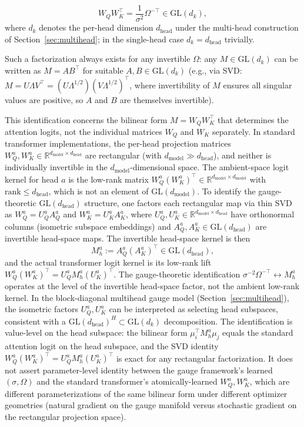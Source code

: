 \documentclass[twoside,11pt]{article}
\begin{document}
\begin{equation}
W_Q W_K^\top = \frac{1}{\sigma^2} \Omega^{-\top} \in \mathrm{GL}(d_k),
\end{equation}
where $d_k$ denotes the per-head dimension $d_{\text{head}}$ under the multi-head construction of Section~\ref{sec:multihead}; in the single-head case $d_k = d_{\text{head}}$ trivially.

Such a factorization always exists for any invertible $\Omega$: any $M \in \mathrm{GL}(d_k)$ can be written as $M = AB^\top$ for suitable $A, B \in \mathrm{GL}(d_k)$ (e.g., via SVD: $M = U\Lambda V^\top = (U\Lambda^{1/2})(V\Lambda^{1/2})^\top$, where invertibility of $M$ ensures all singular values are positive, so $A$ and $B$ are themselves invertible).

This identification concerns the bilinear form $M = W_Q W_K^\top$ that determines the attention logits, not the individual matrices $W_Q$ and $W_K$ separately. In standard transformer implementations, the per-head projection matrices $W_Q^a, W_K^a \in \mathbb{R}^{d_{\text{model}} \times d_{\text{head}}}$ are rectangular (with $d_{\text{model}} \gg d_{\text{head}}$), and neither is individually invertible in the $d_{\text{model}}$-dimensional space. The ambient-space logit kernel for head $a$ is the low-rank matrix $W_Q^a (W_K^a)^\top \in \mathbb{R}^{d_{\text{model}} \times d_{\text{model}}}$ with $\mathrm{rank} \leq d_{\text{head}}$, which is not an element of $\mathrm{GL}(d_{\text{model}})$. To identify the gauge-theoretic $\mathrm{GL}(d_{\text{head}})$ structure, one factors each rectangular map via thin SVD as $W_Q^a = U_Q^a A_Q^a$ and $W_K^a = U_K^a A_K^a$, where $U_Q^a, U_K^a \in \mathbb{R}^{d_{\text{model}} \times d_{\text{head}}}$ have orthonormal columns (isometric subspace embeddings) and $A_Q^a, A_K^a \in \mathrm{GL}(d_{\text{head}})$ are invertible head-space maps. The invertible head-space kernel is then
%
\begin{equation}
M_h^a := A_Q^a (A_K^a)^\top \in \mathrm{GL}(d_{\text{head}}),
\label{eq:head_space_kernel}
\end{equation}
%
and the actual transformer logit kernel is its low-rank lift $W_Q^a (W_K^a)^\top = U_Q^a M_h^a (U_K^a)^\top$. The gauge-theoretic identification $\sigma^{-2}\Omega^{-\top} \leftrightarrow M_h^a$ operates at the level of the invertible head-space factor, not the ambient low-rank kernel. In the block-diagonal multihead gauge model (Section~\ref{sec:multihead}), the isometric factors $U_Q^a, U_K^a$ can be interpreted as selecting head subspaces, consistent with a $\mathrm{GL}(d_{\text{head}})^H \subset \mathrm{GL}(d_k)$ decomposition. The identification is value-level on the head subspace: the bilinear form $\mu_i^\top M_h^a \mu_j$ equals the standard attention logit on the head subspace, and the SVD identity $W_Q^a (W_K^a)^\top = U_Q^a M_h^a (U_K^a)^\top$ is exact for any rectangular factorization. It does not assert parameter-level identity between the gauge framework's learned $(\sigma, \Omega)$ and the standard transformer's atomically-learned $W_Q^a, W_K^a$, which are different parameterizations of the same bilinear form under different optimizer geometries (natural gradient on the gauge manifold versus stochastic gradient on the rectangular projection space).
\end{document}
